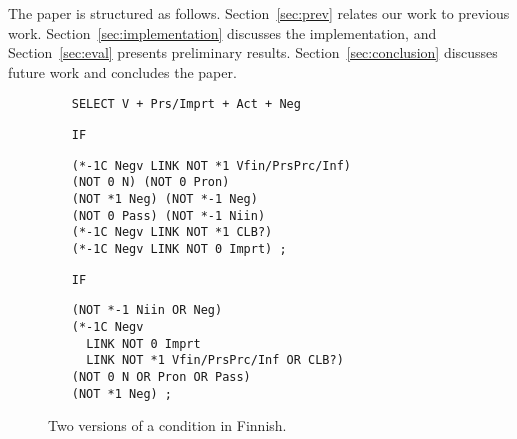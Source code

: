 The paper is structured as follows. Section~\ref{sec:prev} relates our
work to previous work. 
Section~\ref{sec:implementation} discusses the implementation, and
Section~\ref{sec:eval} presents preliminary results. 
Section~\ref{sec:conclusion} discusses future work and concludes the paper.


\begin{figure}[t]
\centering
\begin{itemize}

\item[]\texttt{SELECT V + Prs/Imprt + Act + Neg}

\item[\texttt{IF}]
\begin{verbatim}(*-1C Negv LINK NOT *1 Vfin/PrsPrc/Inf) 
(NOT 0 N) (NOT 0 Pron) 
(NOT *1 Neg) (NOT *-1 Neg)
(NOT 0 Pass) (NOT *-1 Niin) 
(*-1C Negv LINK NOT *1 CLB?) 
(*-1C Negv LINK NOT 0 Imprt) ; 
\end{verbatim}

\item[\texttt{IF}]
\begin{verbatim}(NOT *-1 Niin OR Neg)  
(*-1C Negv
  LINK NOT 0 Imprt
  LINK NOT *1 Vfin/PrsPrc/Inf OR CLB?) 
(NOT 0 N OR Pron OR Pass) 
(NOT *1 Neg) ;
\end{verbatim}
\end{itemize}

\caption{Two versions of a condition in Finnish.}

\label{fig:regroup}
\end{figure}






